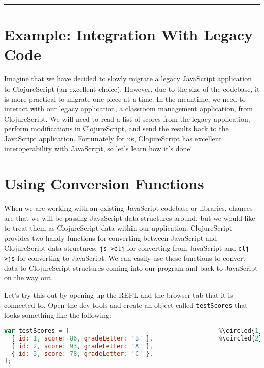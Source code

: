 \documentclass[10pt,twoside,openright]{memoir}
\newcommand*\circled[1]{\tikz[baseline=(char.base)]{
            \node[shape=circle,draw,inner sep=1pt] (char) {#1};}}
\begin{document}
\begin{center}\rule{0.5\linewidth}{0.5pt}\end{center}


\section{Example: Integration With Legacy Code}

Imagine that we have decided to slowly migrate a legacy JavaScript
application to ClojureScript (an excellent choice). However, due to the
size of the codebase, it is more practical to migrate one piece at a
time. In the meantime, we need to interact with our legacy application,
a classroom management application, from ClojureScript. We will need to
read a list of scores from the legacy application, perform modifications
in ClojureScript, and send the results back to the JavaScript
application. Fortunately for us, ClojureScript has excellent
interoperability with JavaScript, so let's learn how it's done!


\section{Using Conversion Functions}

When we are working with an existing JavaScript codebase or libraries,
chances are that we will be passing JavaScript data structures around,
but we would like to treat them as ClojureScript data within our
application. ClojureScript provides two handy functions for converting
between JavaScript and ClojureScript data structures:
\texttt{js-\textgreater{}clj} for converting from JavaScript and
\texttt{clj-\textgreater{}js} for converting to JavaScript. We can
easily use these functions to convert data to ClojureScript structures
coming into our program and back to JavaScript on the way out.

Let's try this out by opening up the REPL and the browser tab that it is
connected to. Open the dev tools and create an object called
\texttt{testScores} that looks something like the following:

\begin{lstlisting}[language=JavaScript, caption={Creating a JS object}]
var testScores = [                                         %\circled{1}%
  { id: 1, score: 86, gradeLetter: "B" },                  %\circled{2}%
  { id: 2, score: 93, gradeLetter: "A" },
  { id: 3, score: 78, gradeLetter: "C" },
];
\end{lstlisting}
\end{document}
